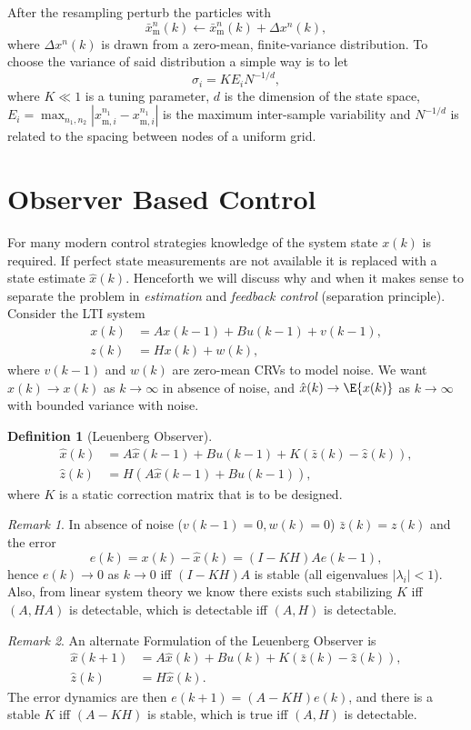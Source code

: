 \documentclass[]{hsrzf}
\theoremstyle{plain}
\theoremstyle{definition}
\newtheorem{defn}{Definition}[section]
\theoremstyle{remark}
\newtheorem*{remark}{Remark}
\begin{document}
After the resampling perturb the particles with
\[
  \bar{x}_\mathrm{m}^n(k) \leftarrow \bar{x}_\mathrm{m}^n(k) + \Delta x^n(k),
\]
where $\Delta x^n(k)$ is drawn from a zero-mean, finite-variance distribution.
To choose the variance of said distribution a simple way is to let
\[
  \sigma_i = K E_i N^{-1/d},
\]
where $K \ll 1$ is a tuning parameter, $d$ is the dimension of the state
space, $E_i = \max_{n_1, n_2} | x_{\mathrm{m},i}^{n_1} -
x_{\mathrm{m},i}^{n_1} |$ is the maximum inter-sample variability and
$N^{-1/d}$ is related to the spacing between nodes of a uniform grid.

\section{Observer Based Control}

For many modern control strategies knowledge of the system state $x(k)$ is
required. If perfect state measurements are not available it is replaced with
a state estimate $\hat{x}(k)$. Henceforth we will discuss why and when it
makes sense to separate the problem in \emph{estimation} and \emph{feedback
control} (separation principle). Consider the LTI system
\begin{align*}
  x(k) &= Ax(k-1) + Bu(k-1) + v(k-1), \\
  z(k) &= Hx(k) + w(k),
\end{align*}
where $v(k-1)$ and $w(k)$ are zero-mean CRVs to model noise. We want
$\hat{x}(k) \to x(k)$ as $k \to \infty$ in absence of noise, and $\hat{x}(k)
\to \E{x(k)}$ as $k \to \infty$ with bounded variance with noise.

\begin{defn}[Leuenberg Observer]
  \begin{align*}
    \hat{x}(k) &= A\hat{x}(k-1) + Bu(k-1) + K(\bar{z}(k) - \hat{z}(k)), \\
    \hat{z}(k) &= H(A\hat{x}(k-1) + Bu(k-1)),
  \end{align*}
  where $K$ is a static correction matrix that is to be designed.
\end{defn}

\begin{remark}
  In absence of noise ($v(k-1) = 0, w(k) = 0$) $\bar{z}(k) = z(k)$ and the
  error
  \[
    e(k) = x(k) - \hat{x}(k) = (I - KH) A e(k-1),
  \]
  hence $e(k) \to 0$ as $k\to 0$ iff $(I - KH)A$ is stable (all eigenvalues
  $|\lambda_i| < 1$). Also, from linear system theory we know there exists
  such stabilizing $K$ iff $(A, HA)$ is detectable, which is detectable iff
  $(A,H)$ is detectable.
\end{remark}
\begin{remark}
  An alternate Formulation of the Leuenberg Observer is
    \begin{align*}
    \hat{x}(k+1) &= A\hat{x}(k) + Bu(k) + K(\bar{z}(k) - \hat{z}(k)), \\
    \hat{z}(k) &= H\hat{x}(k).
  \end{align*}
  The error dynamics are then $e(k+1) = (A-KH) e(k)$, and there is a stable
  $K$ iff $(A-KH)$ is stable, which is true iff $(A,H)$ is detectable.
\end{remark}
\end{document}
